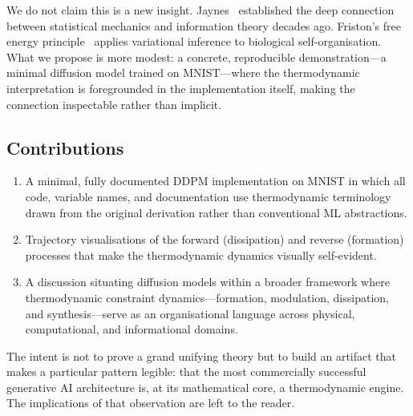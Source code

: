 We do not claim this is a new insight. Jaynes~\cite{jaynes1957information} established the deep connection between statistical mechanics and information theory decades ago. Friston's free energy principle~\cite{friston2010free} applies variational inference to biological self-organisation. What we propose is more modest: a concrete, reproducible demonstration---a minimal diffusion model trained on MNIST---where the thermodynamic interpretation is foregrounded in the implementation itself, making the connection inspectable rather than implicit.

\subsection{Contributions}

\begin{enumerate}
    \item A minimal, fully documented DDPM implementation on MNIST in which all code, variable names, and documentation use thermodynamic terminology drawn from the original derivation rather than conventional ML abstractions.
    \item Trajectory visualisations of the forward (dissipation) and reverse (formation) processes that make the thermodynamic dynamics visually self-evident.
    \item A discussion situating diffusion models within a broader framework where thermodynamic constraint dynamics---formation, modulation, dissipation, and synthesis---serve as an organisational language across physical, computational, and informational domains.
\end{enumerate}

The intent is not to prove a grand unifying theory but to build an artifact that makes a particular pattern legible: that the most commercially successful generative AI architecture is, at its mathematical core, a thermodynamic engine. The implications of that observation are left to the reader.